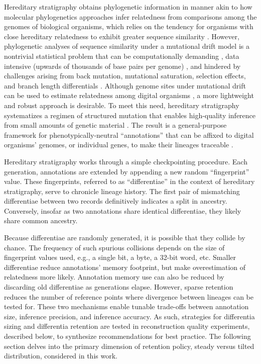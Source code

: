 Hereditary stratigraphy obtains phylogenetic information in manner akin to how molecular phylogenetics approaches infer relatedness from comparisons among the genomes of biological organisms, which relies on the tendency for organisms with close hereditary relatedness to exhibit greater sequence similarity \citep{yang2012molecular}.
However, phylogenetic analyses of sequence similarity under a mutational drift model is a nontrivial statistical problem \citep{neyman1971molecular} that can be computationally demanding \citep{konno2022deep,stamatakis2013novel}, data intensive (upwards of thousands of base pairs per genome) \citep{parks2009increasing,cloutier2019whole,wortley2005much}, and hindered by challenges arising from back mutation, mutational saturation, selection effects, and branch length differentials \citep{brocchieri2001phylogenetic,moreira2000molecular}.
Although genome sites under mutational drift can be used to estimate relatedness among digital organisms \citep{moreno2021case}, a more lightweight and robust approach is desirable.
To meet this need, hereditary stratigraphy systematizes a regimen of structured mutation that enables high-quality inference from small amounts of genetic material \citep{moreno2022hereditary}.
The result is a general-purpose framework for phenotypically-neutral ``annotations'' that can be affixed to digital organisms' genomes, or individual genes, to make their lineages traceable \citep{moreno2022hstrat}.

Hereditary stratigraphy works through a simple checkpointing procedure.
Each generation, annotations are extended by appending a new random ``fingerprint'' value.
These fingerprints, referred to as ``differentiae'' in the context of hereditary stratigraphy, serve to chronicle lineage history.
The first pair of mismatching differentiae between two records definitively indicates a split in ancestry.
Conversely, insofar as two annotations share identical differentiae, they likely share common ancestry.

Because differentiae are randomly generated, it is possible that they collide by chance.
The frequency of such spurious collisions depends on the size of fingerprint values used, e.g., a single bit, a byte, a 32-bit word, etc.
Smaller differentiae reduce annotations' memory footprint, but make overestimation of relatedness more likely.
Annotation memory use can also be reduced by discarding old differentiae as generations elapse.
However, sparse retention reduces the number of reference points where divergence between lineages can be tested for.
These two mechanisms enable tunable trade-offs between annotation size, inference precision, and inference accuracy.
As such, strategies for differentia sizing and differentia retention are tested in reconstruction quality experiments, described below, to synthesize recommendations for best practice.
The following section delves into the primary dimension of retention policy, steady versus tilted distribution, considered in this work.


